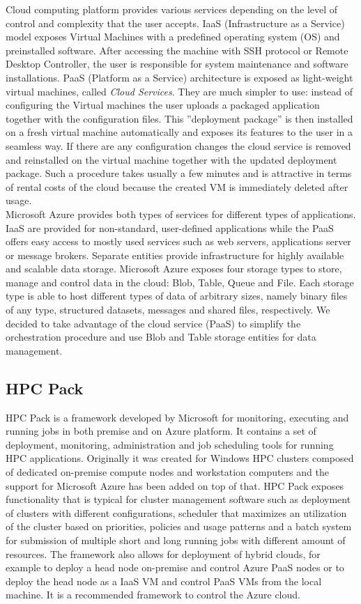 \documentclass[3p,times]{elsarticle}
\begin{document}
Cloud computing platform provides various services depending on the level of control and complexity that the user accepts. IaaS (Infrastructure as a Service) model exposes Virtual Machines with a predefined operating system (OS) and preinstalled software. After accessing the machine with SSH protocol or Remote Desktop Controller, the user is responsible for system maintenance and software installations. PaaS (Platform as a Service) architecture is exposed as light-weight virtual machines, called {\it Cloud Services}. They are much simpler to use: instead of configuring the Virtual machines the user uploads a packaged application together with the configuration files. This ''deployment package'' is then installed on a fresh virtual machine automatically and exposes its features to the user in a seamless way. If there are any configuration changes the cloud service is removed and reinstalled on the virtual machine together with the updated deployment package. Such a procedure takes usually a few minutes and is  attractive in terms of rental costs of the cloud because the created VM is immediately deleted after usage. \\
Microsoft Azure provides both types of services for different types of applications. IaaS are provided for non-standard, user-defined applications while the PaaS offers easy access to mostly used services such as web servers, applications server or message brokers. Separate entities provide infrastructure for highly available and scalable data storage. Microsoft Azure exposes four storage types to store, manage and control data in the cloud: Blob, Table, Queue and File. Each storage type is able to host different types of data of arbitrary sizes, namely binary files of any type, structured datasets, messages and shared files, respectively. We decided to take advantage of the cloud service (PaaS) to simplify the orchestration procedure and use Blob and Table storage entities for data management. 

\subsection{HPC Pack}

HPC Pack is a framework developed by Microsoft for monitoring, executing and running jobs in both premise and on Azure platform. It contains a set of deployment, monitoring, administration and job scheduling tools for running HPC applications. Originally it was created for Windows HPC clusters composed of dedicated on-premise compute nodes and workstation computers and the support for Microsoft Azure has been added on top of that. HPC Pack exposes functionality that is typical for cluster management software such as deployment of clusters with different configurations, scheduler that maximizes an utilization of the cluster based on priorities, policies and usage patterns and a batch system for submission of multiple short and long running jobs with different amount of resources. The framework also allows for deployment of hybrid clouds, for example to deploy a head node on-premise and control Azure PaaS nodes or to deploy the head node as a IaaS VM and control PaaS VMs from the local machine. It is a recommended framework to control the Azure cloud.
\end{document}
